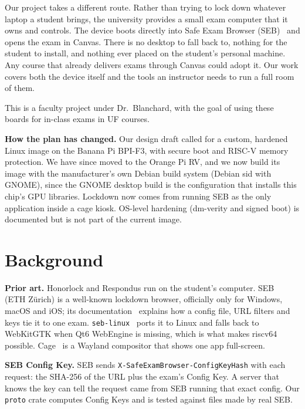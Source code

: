 \documentclass[11pt]{article}
\begin{document}
Our project takes a different route. Rather than trying to lock down whatever laptop a student brings, the university provides a small exam computer that it owns and controls. The device boots directly into Safe Exam Browser (SEB)~\cite{safeexambrowser} and opens the exam in Canvas. There is no desktop to fall back to, nothing for the student to install, and nothing ever placed on the student's personal machine. Any course that already delivers exams through Canvas could adopt it. Our work covers both the device itself and the tools an instructor needs to run a full room of them.

This is a faculty project under Dr.~Blanchard, with the goal of using these boards for in-class exams in UF courses.

\textbf{How the plan has changed.} Our design draft called for a custom, hardened Linux image on the Banana Pi BPI-F3, with secure boot and RISC-V memory protection. We have since moved to the Orange Pi RV, and we now build its image with the manufacturer's own Debian build system (Debian sid with GNOME), since the GNOME desktop build is the configuration that installs this chip's GPU libraries. Lockdown now comes from running SEB as the only application inside a cage kiosk. OS-level hardening (dm-verity and signed boot) is documented but is not part of the current image.

\section{Background}

\textbf{Prior art.} Honorlock and Respondus run on the student's computer. SEB~\cite{safeexambrowser} (ETH Z\"urich) is a well-known lockdown browser, officially only for Windows, macOS and iOS; its documentation~\cite{seb_concept} explains how a config file, URL filters and keys tie it to one exam. \texttt{seb-linux}~\cite{seblinux} ports it to Linux and falls back to WebKitGTK when Qt6 WebEngine is missing, which is what makes riscv64 possible. Cage~\cite{cage_kiosk} is a Wayland compositor that shows one app full-screen.

\textbf{SEB Config Key.} SEB sends \texttt{X-SafeExamBrowser-ConfigKeyHash} with each request: the SHA-256 of the URL plus the exam's Config Key. A server that knows the key can tell the request came from SEB running that exact config. Our \texttt{proto} crate computes Config Keys and is tested against files made by real SEB.
\end{document}
